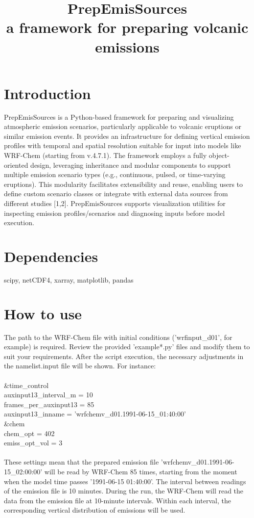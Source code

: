 \documentclass{article}
\title{PrepEmisSources \\ a framework for preparing volcanic emissions}
\begin{document}
\maketitle

\section{Introduction}
PrepEmisSources is a Python-based framework for preparing and visualizing atmospheric emission scenarios, particularly applicable to volcanic eruptions or similar emission events. It provides an infrastructure for defining vertical emission profiles with temporal and spatial resolution suitable for input into models like WRF-Chem (starting from v.4.7.1). The framework employs a fully object-oriented design, leveraging inheritance and modular components to support multiple emission scenario types (e.g., continuous, pulsed, or time-varying eruptions). This modularity facilitates extensibility and reuse, enabling users to define custom scenario classes or integrate with external data sources from different studies [1,2]. PrepEmisSources supports visualization utilities for inspecting emission profiles/scenarios and diagnosing inputs before model execution. 

\section{Dependencies}

scipy, netCDF4, xarray, matplotlib, pandas

\section{How to use}
The path to the WRF-Chem file with initial conditions ('wrfinput\_d01', for example) is required. Review the provided 'example*.py' files and modify them to suit your requirements. After the script execution, the necessary adjustments in the namelist.input file will be shown. For instance: \\ \\
    \&time\_control  \\
        auxinput13\_interval\_m = 10 \\
        frames\_per\_auxinput13 = 85 \\
        auxinput13\_inname     = 'wrfchemv\_d01.1991-06-15\_01:40:00' \\
    \&chem \\
        chem\_opt               = 402   \\
        emiss\_opt\_vol          = 3    \\ \\
These settings mean that the prepared emission file 'wrfchemv\_d01.1991-06-15\_02:00:00' will be read by WRF-Chem 85 times, starting from the moment when the model time passes '1991-06-15 01:40:00'. The interval between readings of the emission file is 10 minutes. During the run, the WRF-Chem will read the data from the emission file at 10-minute intervals. Within each interval, the corresponding vertical distribution of emissions will be used.
\end{document}
